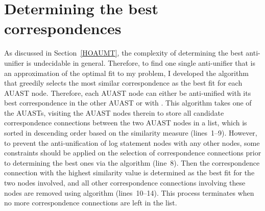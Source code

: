 







\section{Determining the best correspondences}  \label{best-corr}


As discussed in Section~\ref{HOAUMT}, the complexity of determining the best anti-unifier is undecidable in general. Therefore, to find one single anti-unifier that is an approximation of the optimal fit to my problem, I developed the  algorithm that greedily selects the most similar correspondence as the best fit for each AUAST node. Therefore, each AUAST node can either be anti-unified with its best correspondence in the other AUAST or with \nothing. This algorithm takes one of the AUASTs, visiting the AUAST nodes therein to store all candidate correspondence connections between the two AUAST nodes in a list, which is sorted in descending order based on the similarity measure (lines~1--9). However, to prevent the anti-unification of log statement nodes with any other nodes, some constraints should be applied on the selection of correspondence connections prior to determining the best ones via the  algorithm (line~8). Then the correspondence connection with the highest similarity value is determined as the best fit for the two nodes involved, and all other correspondence connections involving these nodes are removed using  algorithm (lines~10--14). This process terminates when no more correspondence connections are left in the list.

